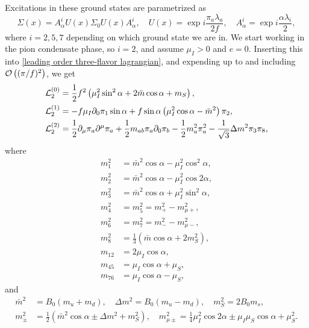 Excitations in these ground states are parametrized as
%
\begin{equation}
    \Sigma(x) = A^i_\alpha U(x) \Sigma_0 U(x) A^i_\alpha, \quad
    U(x) = \exp{i \frac{\pi_a \lambda_a}{2 f}}, \quad
    A_\alpha^i = \exp{i \frac{\alpha \lambda_i}{2}},
\end{equation}
%
where $i = 2, 5, 7$ depending on which ground state we are in.
We start working in the pion condensate phase, so $i = 2$, and assume $\mu_I > 0$ and $e = 0$.
Inserting this into \autoref{leading order three-flavor lagrangian}, and expending up to and including $\mathcal O\left((\pi/f)^2\right)$, we get
%
\begin{align}
    \mathcal{L}_2^{(0)} 
    &=
    \frac{1}{2} f^2
    \left(
        \mu_I^2 \sin^2\alpha
        + 2\bar m \cos\alpha
        + m_S
    \right), \\
    \mathcal{L}_2^{(1)}
    &=
    -f \mu_I \partial_0 \pi_1 \sin\alpha
    + f \sin\alpha
    \left(
        \mu_I^2\cos\alpha - \bar m^2
    \right)\pi_2, \\
    \mathcal{L}_2^{(2)} 
    &= 
    \frac{1}{2}\partial_\mu \pi_a \partial^\mu \pi_a
    + \frac{1}{2} m_{ab} \pi_a\partial_0\pi_b
    - \frac{1}{2} m_a^2 \pi_a^2
    - \frac{1}{\sqrt{3}} \Delta m^2 \pi_3 \pi_8,
\end{align}
%
where
%
\begin{align}
    m_1^2 &=  \bar m^2\cos\alpha - \mu_I^2 \cos^2\alpha,\\
    m_2^2 &= \bar m^2\cos\alpha - \mu_I^2 \cos2\alpha, \\
    m_3^2 &= \bar m^2\cos\alpha + \mu_I^2 \sin^2\alpha, \\
    m_4^2 &= m_5^2 = m_+^2 - m_{\mu+}^2, \\
    m_6^2 &= m_7^2 = m_-^2 - m^2_{\mu-}, \\
    m_8^2 &= \frac{1}{3} (\bar m\cos\alpha + 2 m_S^2), \\
    m_{12} & = 2 \mu_I\cos\alpha,\\
    m_{45} & =\mu_I\cos\alpha + \mu_S, \\
    m_{76} & = \mu_I\cos\alpha - \mu_S,
\end{align}
%
and
\begin{align}
    \bar m^2 &=  B_0(m_u + m_d),\quad 
    \Delta m^2 = B_0(m_u - m_d), \quad
    m_S^2 = 2B_0 m_s, \\
    m_\pm^2 &= \frac{1}{2} (\bar m^2 \cos\alpha \pm \Delta m^2 + m_S^2),
    \quad
    m^2_{\mu\pm } = \frac{1}{4}\mu_I^2 \cos2\alpha \pm \mu_I\mu_S \cos\alpha + \mu_S^2.
\end{align}

